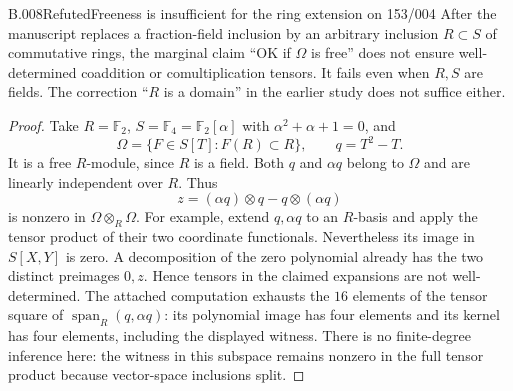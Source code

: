 \begin{saresult}{B.008}{Refuted}{Freeness is insufficient for the ring extension on 153/004}
After the manuscript replaces a fraction-field inclusion by an
arbitrary inclusion $R\subset S$ of commutative rings, the marginal
claim ``OK if $\Omega$ is free'' does not ensure well-determined
coaddition or comultiplication tensors. It fails even when $R,S$
are fields. The correction ``$R$ is a domain'' in the earlier study
does not suffice either.
\end{saresult}
\begin{proof}
Take $R=\mathbb F_2$, $S=\mathbb F_4=\mathbb F_2[\alpha]$ with
$\alpha^2+\alpha+1=0$, and
\[
 \Omega=\{F\in S[T]:F(R)\subset R\},\qquad q=T^2-T.
\]
It is a free $R$-module, since $R$ is a field. Both $q$ and
$\alpha q$ belong to $\Omega$ and are linearly independent over
$R$. Thus
\[
  z=(\alpha q)\otimes q-q\otimes(\alpha q)
\]
is nonzero in $\Omega\otimes_R\Omega$. For example, extend
$q,\alpha q$ to an $R$-basis and apply the tensor product of their
two coordinate functionals. Nevertheless its image in $S[X,Y]$
is zero. A decomposition of the zero polynomial already has the
two distinct preimages $0,z$. Hence tensors in the claimed
expansions are not well-determined. The attached computation
exhausts the $16$ elements of the tensor square of
$\operatorname{span}_R(q,\alpha q)$: its polynomial image has four
elements and its kernel has four elements, including the displayed
witness. There is no finite-degree inference here: the witness in
this subspace remains nonzero in the full tensor product because
vector-space inclusions split.
\end{proof}

